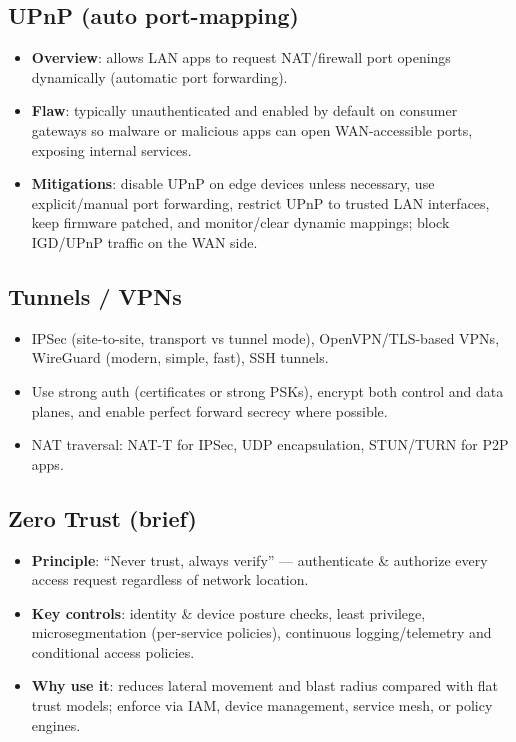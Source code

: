 \documentclass[11pt]{article}
\begin{document}
\subsection{UPnP (auto port-mapping)}
\begin{itemize}
  \item \textbf{Overview}: allows LAN apps to request NAT/firewall port openings dynamically (automatic port forwarding).
  
  \item \textbf{Flaw}: typically unauthenticated and enabled by default on consumer gateways so malware or malicious apps can open WAN-accessible ports, exposing internal services.
  
  \item \textbf{Mitigations}: disable UPnP on edge devices unless necessary, use explicit/manual port forwarding, restrict UPnP to trusted LAN interfaces, keep firmware patched, and monitor/clear dynamic mappings; block IGD/UPnP traffic on the WAN side.
\end{itemize}

\subsection{Tunnels / VPNs}
\begin{itemize}
  \item IPSec (site-to-site, transport vs tunnel mode), OpenVPN/TLS-based VPNs, WireGuard (modern, simple, fast), SSH tunnels.
  
  \item Use strong auth (certificates or strong PSKs), encrypt both control and data planes, and enable perfect forward secrecy where possible.
  
  \item NAT traversal: NAT-T for IPSec, UDP encapsulation, STUN/TURN for P2P apps.
\end{itemize}

\subsection{Zero Trust (brief)}
\begin{itemize}
  \item \textbf{Principle}: ``Never trust, always verify'' --- authenticate \& authorize every access request regardless of network location.
  
  \item \textbf{Key controls}: identity \& device posture checks, least privilege, microsegmentation (per-service policies), continuous logging/telemetry and conditional access policies.
  
  \item \textbf{Why use it}: reduces lateral movement and blast radius compared with flat trust models; enforce via IAM, device management, service mesh, or policy engines.
\end{itemize}
\end{document}
